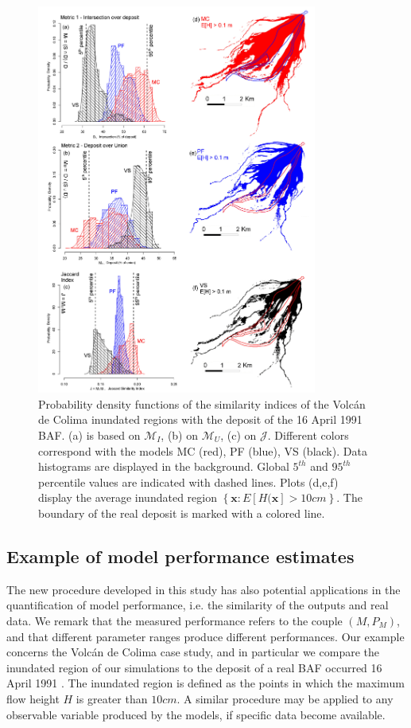 \documentclass{article}
\begin{document}
\begin{figure}[H]
         \centering
        \includegraphics[width=0.82\textwidth]{Figures/Histograms.jpg}
        \caption{Probability density functions of the similarity indices of the Volc{\'a}n de Colima inundated regions with the deposit of the 16 April 1991 BAF. (a) is based on $\mathcal M_I$, (b) on $\mathcal M_U$, (c) on $\mathcal J$. Different colors correspond with the models MC (red), PF (blue), VS (black). Data histograms are displayed in the background. Global $5^{th}$ and $95^{th}$ percentile values are indicated with dashed lines. Plots (d,e,f) display the average inundated region $\left\{\textbf{x} : E[H(\textbf{x}]>10 cm\right\}$. The boundary of the real deposit is marked with a colored line.}\label{fig:Colima-Hist}
\end{figure}

\subsection{Example of model performance estimates}
The new procedure developed in this study has also potential applications in the quantification of model performance, i.e. the similarity of the outputs and real data. We remark that the measured performance refers to the couple $\left(M, P_M\right)$, and that different parameter ranges produce different performances. Our example concerns the Volc{\'a}n de Colima case study, and in particular we compare the inundated region of our simulations to the deposit of a real BAF occurred 16 April 1991 \citep{Saucedo2004}. The inundated region is defined as the points in which the maximum flow height $H$ is greater than $10 cm$. A similar procedure may be applied to any observable variable produced by the models, if specific data become available.
\end{document}
